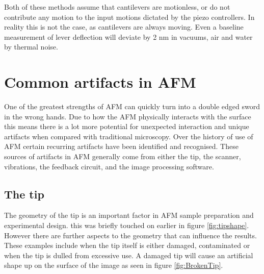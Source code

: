 Both of these methods assume that cantilevers are motionless, or do not contribute any motion to the input motions dictated by the piezo controllers. In reality this is not the case, as cantilevers are always moving. Even a baseline measurement of lever deflection will deviate by 2 nm in vacuums, air and water by thermal noise.\cite{AFMTalk} \cite{AFMCalibration, AFMCalibration2}








\section{Common artifacts in AFM}
\label{chap:commonArtifacts}

One of the greatest strengths of AFM can quickly turn into a double edged sword in the wrong hands. Due to how the AFM physically interacts with the surface this means there is a lot more potential for unexpected interaction and unique artifacts when compared with traditional microscopy. Over the history of use of AFM certain recurring artifacts have been identified and recognised. These sources of artifacts in AFM generally come from either the tip, the scanner, vibrations, the feedback circuit, and the image processing software. 

\subsection{The tip}

The geometry of the tip is an important factor in AFM sample preparation and experimental design. this was briefly touched on earlier in figure \ref{fig:tipshape}. However there are further aspects to the geometry that can influence the results. These examples include when the tip itself is either damaged, contaminated or when the tip is dulled from excessive use. A damaged tip will cause an artificial shape up on the surface of the image as seen in figure \ref{fig:BrokenTip}. 

